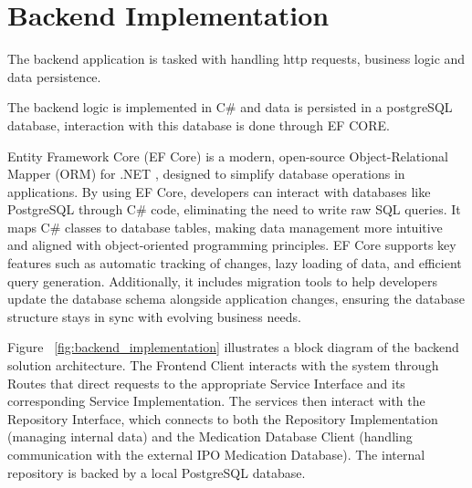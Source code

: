 %
%
\chapter{Backend Implementation} \label{cap:backend_implementation}

The backend application is tasked with handling http requests, business logic and data persistence. 

The backend logic is implemented in C{\#} and data is persisted in a postgreSQL database, interaction with this database is done through EF CORE.

Entity Framework Core (EF Core) \cite{EF_Core} is a modern, open-source Object-Relational Mapper (ORM) for .NET \cite{.NET}, designed to simplify database operations in applications. By using EF Core, developers can interact with databases like PostgreSQL \cite{PGSQL} through C{\#} code, eliminating the need to write raw SQL queries. It maps C{\#} classes to database tables, making data management more intuitive and aligned with object-oriented programming principles. EF Core supports key features such as automatic tracking of changes, lazy loading of data, and efficient query generation. Additionally, it includes migration tools to help developers update the database schema alongside application changes, ensuring the database structure stays in sync with evolving business needs.


Figure ~\ref{fig:backend_implementation} illustrates a block diagram of the backend solution architecture. The Frontend Client interacts with the system through Routes that direct requests to the appropriate Service Interface and its corresponding Service Implementation. The services then interact with the Repository Interface, which connects to both the Repository Implementation (managing internal data) and the Medication Database Client (handling communication with the external IPO Medication Database). The internal repository is backed by a local PostgreSQL database.

